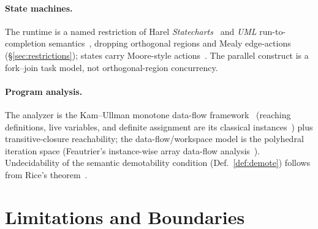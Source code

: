 \documentclass[11pt]{article}
\theoremstyle{plain}
\theoremstyle{definition}
\theoremstyle{remark}
\newcommand{\state}[1]{\textsf{#1}}
\begin{document}
\paragraph{State machines.} The runtime is a named restriction of Harel
\emph{Statecharts}~\cite{harel} and \emph{UML} run-to-completion
semantics~\cite{uml,scxml,samek}, dropping orthogonal regions and Mealy
edge-actions (\S\ref{sec:restrictions}); states carry Moore-style
actions~\cite{moore}. The \state{parallel} construct is a fork--join task model, not
orthogonal-region concurrency.

\paragraph{Program analysis.} The analyzer is the Kam--Ullman monotone data-flow
framework~\cite{kamullman,kildall} (reaching definitions, live variables, and
definite assignment are its classical instances~\cite{dragon,nielson}) plus
transitive-closure reachability; the data-flow/workspace model is the polyhedral
iteration space (Feautrier's instance-wise array data-flow
analysis~\cite{feautrier}). Undecidability of the semantic demotability condition
(Def.~\ref{def:demote}) follows from Rice's theorem~\cite{rice}.

\section{Limitations and Boundaries}\label{sec:limitations}
\end{document}
